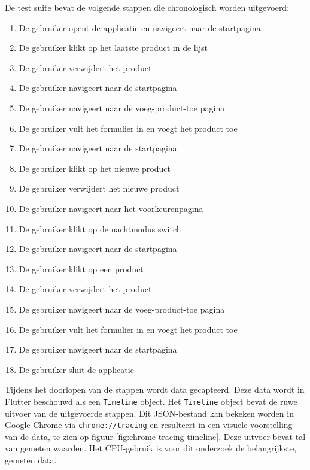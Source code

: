 De test suite bevat de volgende stappen die chronologisch worden uitgevoerd:
\begin{enumerate}
    \item De gebruiker opent de applicatie en navigeert naar de startpagina
    \item De gebruiker klikt op het laatste product in de lijst
    \item De gebruiker verwijdert het product
    \item De gebruiker navigeert naar de startpagina
    \item De gebruiker navigeert naar de voeg-product-toe pagina
    \item De gebruiker vult het formulier in en voegt het product toe
    \item De gebruiker navigeert naar de startpagina
    \item De gebruiker klikt op het nieuwe product
    \item De gebruiker verwijdert het nieuwe product
    \item De gebruiker navigeert naar het voorkeurenpagina
    \item De gebruiker klikt op de nachtmodus switch
    \item De gebruiker navigeert naar de startpagina
    \item De gebruiker klikt op een product
    \item De gebruiker verwijdert het product
    \item De gebruiker navigeert naar de voeg-product-toe pagina
    \item De gebruiker vult het formulier in en voegt het product toe
    \item De gebruiker navigeert naar de startpagina
    \item De gebruiker sluit de applicatie
\end{enumerate}


Tijdens het doorlopen van de stappen wordt data gecapteerd. Deze data wordt in Flutter beschouwd als een \verb|Timeline| object. Het \verb|Timeline| object bevat de ruwe uitvoer van de uitgevoerde stappen. Dit JSON-bestand kan bekeken worden in Google Chrome via \verb|chrome://tracing| en resulteert in een visuele voorstelling van de data, te zien op figuur \ref{fig:chrome-tracing-timeline}. Deze uitvoer bevat tal van gemeten waarden. Het CPU-gebruik is voor dit onderzoek de belangrijkste, gemeten data. \newline

